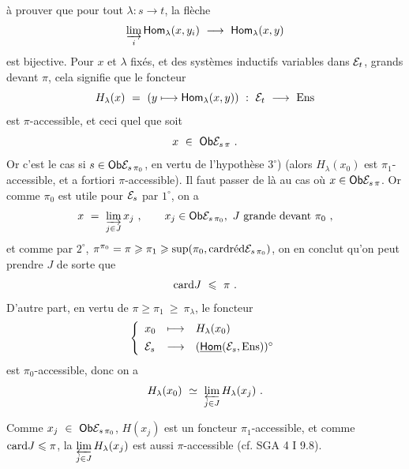 à prouver que pour tout $\lambda : s \longrightarrow t$, la flèche
\[
\varinjlim_{i} \Hom_{\lambda}(x, y_i) \ \longrightarrow \ \Hom_{\lambda}(x, y)
\]
est bijective. Pour $x$ et $\lambda$ fixés, et des systèmes inductifs variables dans $\cE_t$, grands devant $\pi$, cela signifie que le foncteur
\[
H_{\lambda}(x) \ = \ (y \longmapsto \Hom_{\lambda}(x, y)) \ : \ \cE_t \ \longrightarrow \ \Ens
\]
est $\pi$-accessible, et ceci quel que soit
\[
x \ \in \ \Ob \cE_{s\,\pi} \ .
\]
Or c'est le cas si $s \in \Ob \cE_{s\,\pi_0}$, en vertu de l'hypothèse $3^{\circ}$) (alors $H_{\lambda}(x_0)$ est $\pi_1$-accessible, %
et a fortiori $\pi$-accessible). Il faut passer de là au cas où $x \in \Ob \cE_{s\,\pi}$. Or comme $\pi_0$ est utile pour $\cE_s$ par $1^{\circ}$, on a
\[
x \ = \ \varinjlim_{j \in J} x_j \ , \qquad x_j \in \Ob \cE_{s\,\pi_0},\ J \text{ grande devant } \pi_0 \ ,
\]
et comme par $2^{\circ}$, $\pi^{\pi_0} = \pi \geqslant \pi_1 \geqslant \sup(\pi_0, \card \red \cE_{s\,\pi_0})$, on en conclut qu'on peut prendre $J$ de sorte que
\[
\card J \ \leqslant \ \pi \ .
\]
D'autre part, en vertu de $\pi \geqslant \pi_1 \ \geqslant \ \pi_{\lambda}$, le foncteur
\[
\left\{
\begin{array}{lcl}
x_0 & \longmapsto & H_{\lambda}(x_0) \\[1ex]
\cE_s & \longrightarrow & (\underline{\Hom}(\cE_s, \Ens))^{\circ}
\end{array}
\right.
\]
est $\pi_0$-accessible, donc on a
\[
H_{\lambda}(x_0) \ \simeq \ \varprojlim_{j \in J} H_{\lambda}(x_j) \ .
\]

Comme $x_j \ \in \ \Ob \cE_{s\,\pi_0}$, $H(x_j)$ est un foncteur $\pi_1$-accessible, et comme $\card J \leqslant \pi$, la $\varprojlim\limits_{j \in J} H_{\lambda}(x_j)$ est aussi $\pi$-accessible (cf. SGA 4 I 9.8).

